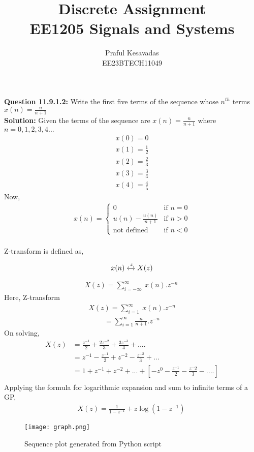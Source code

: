 \documentclass{article}
\begin{document}
\title{
\Huge\textbf{Discrete Assignment}\\
\Huge\textbf{EE1205} Signals and Systems\\
}
\large\author{Praful Kesavadas\\EE23BTECH11049}
\maketitle
\textbf{Question 11.9.1.2:}
Write the first five terms of the sequence whose $n^{th}$ terms  $x(n) = \frac{n}{n+1}$\\
\textbf{Solution:}
Given the terms of the sequence are $x(n) = \frac{n}{n+1}$ where $n = 0,1,2,3,4...$\\
\begin{align*}
    x(0)=0\\
    x(1)=\frac{1}{2}\\
    x(2)=\frac{2}{3}\\
    x(3)=\frac{3}{4}\\
    x(4)=\frac{4}{5}
\end{align*}
Now,
\begin{align*}
    x(n) = 
    \begin{cases}
        0 & \text{if }n=0\\
        u(n) -\frac{u(n)}{n+1} & \text{if }n > 0\\
        \text{not defined } & \text{if }n <0
    \end{cases}
\end{align*}\\
Z-transform is defined as, 

$$ x(n) \xleftrightarrow z  X(z)$$

\begin{align}
X(z) =  \sum_{i=-\infty}^\infty\ x(n).z^{-n}\
\end{align}
Here, Z-transform
\begin{align}
X(z) = \sum_{i=1}^\infty\ x(n).z^{-n}
\end{align}
\begin{align}
= \sum_{i=1}^\infty \frac{n}{n+1} . z^{-n}
\end{align}
On solving, 
\begin{align*}
    X(z)&= \frac{z^{-1}}{2} + \frac{2z^{-2}}{3} + \frac{3z^{-3}}{4}+....\\
    &= z^{-1}-\frac{z^{-1}}{2}+ z^{-2} - \frac{z^{-2}}{3}+...\\
    &= 1+z^{-1}+z^{-2}+...+[-z^{0} - \frac{z^{-1}}{2} - \frac{z^-2}{3}-....] \\
\end{align*}
Applying the formula for logarithmic expansion and sum to infinite terms of a GP,
\begin{align}
X(z) = \frac{1}{1-z^{-1}} + z\log{(1-z^{-1})}\
\end{align}
\begin{figure}[h]
    \centering
    \texttt{[image: graph.png]}
    \caption{Sequence plot generated from Python script}
    \label{fig:sequence-plot}
\end{figure}
\end{document}
